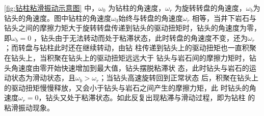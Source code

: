 \documentclass[12pt,hyperref,a4paper,UTF8]{ctexart}
\begin{document}
	
	\autoref{fig:钻柱粘滑振动示意图} 中，$\omega _0$ 为钻柱的角速度，${\omega _r}$ 为旋转转盘的角速度，${\omega _b}$为钻头的角速度。图中钻柱的角速度${\omega_0}$始终与转盘的角速度${\omega _r}$ 相等，当井下岩石与钻头之间的摩擦力矩大于旋转转盘传递到钻头的驱动扭矩时，钻头的角速度为零，即${\omega _b}=0$ ，钻头由于无法转动而处于粘滞状态，此时转盘的角速度不变，还为${\omega _r}$；而转盘与钻柱此时还在继续转动，由钻 柱传递到钻头上的驱动扭矩也一直积聚在钻头上，当积聚在钻头上的驱动扭矩远远大于 钻头与岩石间的摩擦力矩时，钻头角速度由零开始快速增加到最大值，钻头摆脱粘滞状 态，此时钻头与岩石的运动状态为滑动状态，且${\omega _b} > {\omega _r}$；当钻头高速旋转回到正常状态 后，积聚在钻头上的驱动扭矩慢慢释放，又会小于钻头与岩石之间产生的摩擦力矩，此 时钻头的角速度${\omega _r}=0$，钻头又处于粘滞状态。如此反复出现粘滞与滑动过程，即为钻柱 的粘滑振动现象。
	
	
	

	
\end{document}
